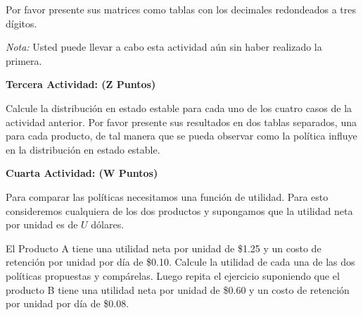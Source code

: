 \documentclass[ a4paper, twoside, 11pt]{article}
\begin{document}
\begin{problem}
Por favor presente sus matrices como tablas con los decimales redondeados a tres d\'igitos.

\emph{Nota:} Usted puede llevar a cabo esta actividad a\'un sin haber realizado la primera. 

\textbf{Tercera Actividad: (Z Puntos)}

Calcule la distribuci\'on en estado estable para cada uno de los cuatro casos de la actividad anterior. Por favor presente sus resultados en dos tablas separados, una para cada producto, de tal manera que se pueda observar como la pol\'itica influye en la distribuci\'on en estado estable. 

\textbf{Cuarta Actividad: (W Puntos)}

Para comparar las pol\'iticas necesitamos una funci\'on de utilidad. Para esto consideremos cualquiera de los dos productos y supongamos que la utilidad neta por unidad es de $U$ d\'olares. 

El Producto A tiene una utilidad neta por unidad de \$1.25 y un costo de retenci\'on por unidad por d\'ia de \$0.10. Calcule la utilidad de cada una de las dos pol\'iticas propuestas y comp\'arelas. Luego repita el ejercicio suponiendo que el producto B tiene una utilidad neta por unidad de \$0.60 y un costo de retenci\'on por unidad por d\'ia de \$0.08. 

\end{problem}
\vspace{\baselineskip}
\end{document}
